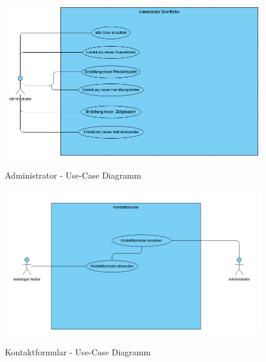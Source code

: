 \clearpage
\pagebreak

\label{Anhang-Use-Cases}

\label{Anhang-Admin}
\begin{figure}[h]
\centering
\begin{minipage}[t]{1\textwidth} 
\caption{Administrator - Use-Case Diagramm} 
\includegraphics[width=1\textwidth]{img/admin-use-case.png}\\
\end{minipage}
\end{figure}

\label{Anhang-Kontakt}
\begin{figure}[h]
\centering
\begin{minipage}[t]{1\textwidth} 
\caption{Kontaktformular - Use-Case Diagramm} 
\includegraphics[width=1\textwidth]{img/kontakt-use-case.png}\\
\end{minipage}
\end{figure}


